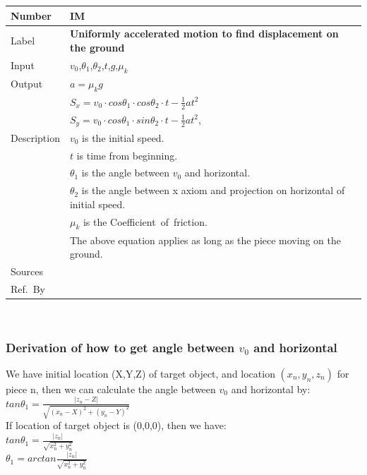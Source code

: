 \documentclass[12pt]{article}
\newcommand{\colAwidth}{0.13\textwidth}
\newcommand{\colBwidth}{0.82\textwidth}
\newcounter{instnum} %
\begin{document}
\noindent
\begin{minipage}{\textwidth}
	\renewcommand*{\arraystretch}{1.5}
	\begin{tabular}{| p{\colAwidth} | p{\colBwidth}|}
		\hline
		\rowcolor[gray]{0.9}
		Number& IM{instnum}\theinstnum \label{IM_DOG}\\
		\hline
		Label& \bf Uniformly accelerated motion to find displacement on the ground\\
		\hline
		Input&$v_{0}$,$\theta_{1}$,$\theta_{2}$,$t$,$g$,$\mu_{k}$\\
		\hline
		Output&$a=\mu_{k}g$\\
		&$S_{x}=v_{0}\cdot cos\theta _{1}\cdot cos\theta _{2}\cdot t-\frac{1}{2}at^{2}$\\
		&$S_{y}=v_{0}\cdot cos\theta _{1}\cdot sin\theta _{2}\cdot t-\frac{1}{2}at^{2}$,\\
		\hline
		Description&$v_{0}$ is the initial speed.\\
		&$t$ is time from beginning.\\
		&$\theta _{1}$ is the angle between $v_{0}$ and horizontal.\\
		&$\theta _{2}$ is the angle between x axiom and projection on horizontal of initial speed.\\
		&$\mu_{k}$ is the Coefficient of friction.\\
		& The above equation applies as long as the piece moving on the ground.
		\\
		\hline
		Sources&~\ \ \\
		\hline
		Ref.\ By & \\
		\hline
	\end{tabular}
\end{minipage}\\


\subsubsection*{Derivation of how to get angle between $v_{0}$ and horizontal}

We have initial location (X,Y,Z) of target object, and location $(x_{n},y_{n},z_{n})$ for piece n, then we can calculate the angle between $v_{0}$ and horizontal by:
~\newline
\\
$tan\theta_{1}=\frac{|z_{n}-Z|}{\sqrt{(x_{n}-X)^{2}+(y_{n}-Y)^{2}}}$
~\newline
\\
If location of target object is (0,0,0), then we have:
~\newline
\\
$tan\theta_{1}=\frac{|z_{n}|}{\sqrt{x_{n}^{2}+y_{n}^{2}}}$
~\newline
\\
$\theta_{1}=arctan \frac{|z_{n}|}{\sqrt{x_{n}^2+y_{n}^2}}$
~\newline
\\
\end{document}
